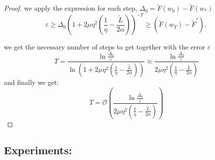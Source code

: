 \documentclass{article}
\begin{document}
\begin{proof}
    we apply the expression for each step, $\Delta_0 = \tilde{F}(w_0) - \tilde{F}(w_{*})$
    \begin{equation*}
    \varepsilon \ge \Delta_0 \left( 1 +  2 \mu \eta^2(\frac{1}{\eta} - \frac{\tilde{L}}{2 \alpha}) \right)^{-T} \ge (\tilde{F}(w_{T}) - \tilde{F}^*),     
    \end{equation*}
    
    we get the necessary number of steps to get together with the error $\varepsilon$
    \begin{equation*}
    T = \frac{\ln \frac{\Delta_0}{\varepsilon}}{\ln(1 + 2 \mu \eta^2(\frac{1}{\eta} - \frac{\tilde{L}}{2 \alpha}))} \approx \frac{\ln \frac{\Delta_0}{\varepsilon}}{2 \mu \eta^2(\frac{1}{\eta} - \frac{\tilde{L}}{2 \alpha})}
    \end{equation*}
    and finally we get:
    \begin{equation*}
    T =  \mathcal{O}\left( \frac{\ln \frac{\Delta_0}{\varepsilon}}{2 \mu \eta^2(\frac{1}{\eta} - \frac{\tilde{L}}{2 \alpha})} \right)
    \end{equation*}
\end{proof}

\subsection{Experiments:}
\end{document}
